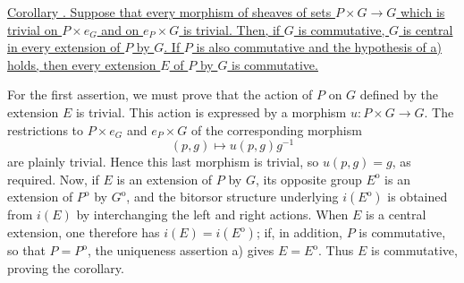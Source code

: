
\underline{Corollary . Suppose that every morphism of sheaves of
sets $P\times G\longrightarrow G$ which is trivial on $P\times e_G$
and on $e_P\times G$ is trivial. Then, if $G$ is commutative, $G$ is
central in every extension of $P$ by $G$. If $P$ is also commutative
and the hypothesis of  a) holds, then every extension $E$ of $P$
by $G$ is commutative.}

For the first assertion, we must prove that the action of $P$ on $G$
defined by the extension $E$ is trivial. This action is expressed by a
morphism $u:P\times G\longrightarrow G$. The restrictions to
$P\times e_G$ and $e_P\times G$ of the corresponding morphism
\[
 (p,g)\longmapsto u(p,g)g^{-1}
\]
are plainly trivial. Hence this last morphism is trivial, so
$u(p,g)=g$, as required. Now, if $E$ is an extension of $P$ by $G$, its
opposite group $E^{\mathrm o}$ is an extension of $P^{\mathrm o}$ by
$G^{\mathrm o}$, and the bitorsor structure underlying
$i(E^{\mathrm o})$ is obtained from $i(E)$ by interchanging the left
and right actions. When $E$ is a central extension, one therefore has
$i(E)=i(E^{\mathrm o})$; if, in addition, $P$ is commutative, so that
$P=P^{\mathrm o}$, the uniqueness assertion  a) gives
$E=E^{\mathrm o}$. Thus $E$ is commutative, proving the corollary.


